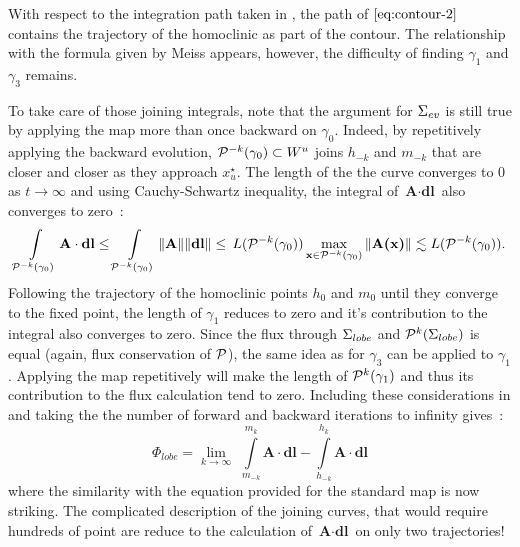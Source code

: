 With respect to the integration path taken in , the path of $\eqref{eq:contour-2}$ contains the trajectory of the homoclinic as part of the contour. The relationship with the formula given by Meiss appears, however, the difficulty of finding $\gamma_1$ and $\gamma_3$ remains. 

To take care of those joining integrals, note that the argument for $\Sigma_{ev}$ is still true by applying the map more than once backward on $\gamma_0$. Indeed, by repetitively applying the backward evolution, $\mathcal{P}^{-k}(\gamma_0)\subset W^u$ joins $h_{-k}$ and $m_{-k}$ that are closer and closer as they approach $x_u^\star$. The length of the the curve converges to 0 as $t\to\infty$ and using Cauchy-Schwartz inequality, the integral of $\textbf{A}\cdot\textbf{dl}$ also converges to zero~:
\begin{equation*}
    \int\limits_{\mathcal{P}^{-k}(\gamma_0)} \textbf{A}\cdot\textbf{dl} \leq \int\limits_{\mathcal{P}^{-k}(\gamma_0)} \Vert\textbf{A}\Vert \Vert\textbf{dl}\Vert \leq\, L(\mathcal{P}^{-k}(\gamma_0))\max\limits_{\textbf{x} \in\mathcal{P}^{-k}(\gamma_0)}\Vert\textbf{A(\textbf{x})}\Vert \lesssim L(\mathcal{P}^{-k}(\gamma_0)).
\end{equation*}
Following the trajectory of the homoclinic points $h_0$ and $m_0$ until they converge to the fixed point, the length of $\gamma_1$ reduces to zero and it's contribution to the integral also converges to zero. Since the flux through $\Sigma_{lobe}$ and $\mathcal{P}^k(\Sigma_{lobe})$ is equal (again, flux conservation of $\mathcal{P}$), the same idea as for $\gamma_3$ can be applied to $\gamma_1$. Applying the map repetitively will make the length of $\mathcal{P}^k(\gamma_1)$ and thus its contribution to the flux calculation tend to zero. Including these considerations in  and taking the the number of forward and backward iterations to infinity gives~:
\begin{equation}\label{eq:flux-algorithm}
    \Phi_{lobe} = \lim\limits_{k\to\infty}\,\,\int\limits_{m_{-k}}^{m_{k}}\textbf{A}\cdot\textbf{dl} - \int\limits_{h_{-k}}^{h_{k}}\textbf{A}\cdot\textbf{dl}
\end{equation}
where the similarity with the equation provided for the standard map \cite[Eq. 21]{meiss_thirty_2015} is now striking. The complicated description of the joining curves, that would require hundreds of point are reduce to the calculation of $\textbf{A}\cdot\textbf{dl}$ on only two trajectories! 

